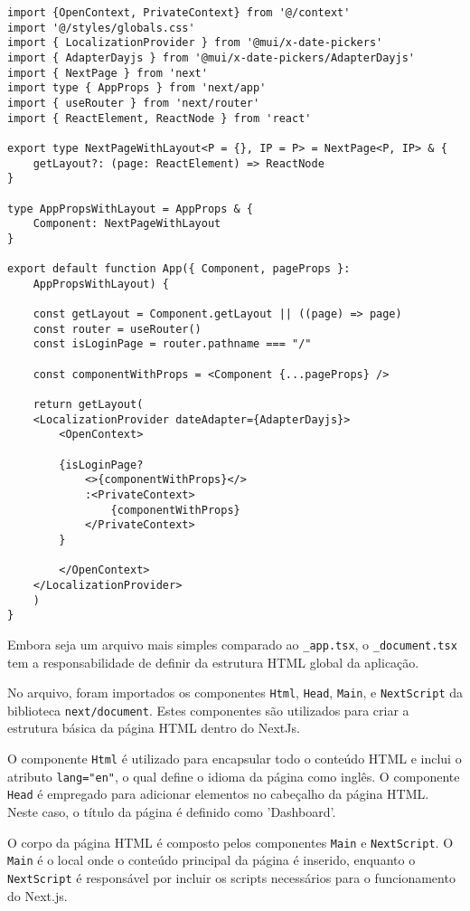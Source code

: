 \begin{verbatim}
import {OpenContext, PrivateContext} from '@/context'
import '@/styles/globals.css'
import { LocalizationProvider } from '@mui/x-date-pickers'
import { AdapterDayjs } from '@mui/x-date-pickers/AdapterDayjs'
import { NextPage } from 'next'
import type { AppProps } from 'next/app'
import { useRouter } from 'next/router'
import { ReactElement, ReactNode } from 'react'

export type NextPageWithLayout<P = {}, IP = P> = NextPage<P, IP> & {
    getLayout?: (page: ReactElement) => ReactNode
}

type AppPropsWithLayout = AppProps & {
    Component: NextPageWithLayout
}

export default function App({ Component, pageProps }: 
    AppPropsWithLayout) {

    const getLayout = Component.getLayout || ((page) => page)
    const router = useRouter()
    const isLoginPage = router.pathname === "/"

    const componentWithProps = <Component {...pageProps} /> 

    return getLayout(
    <LocalizationProvider dateAdapter={AdapterDayjs}>
        <OpenContext>

        {isLoginPage?
            <>{componentWithProps}</>
            :<PrivateContext>
                {componentWithProps}
            </PrivateContext>
        }

        </OpenContext>  
    </LocalizationProvider>
    )
}
\end{verbatim}

Embora seja um arquivo mais simples comparado ao \texttt{\_app.tsx}, o \texttt{\_document.tsx} tem a responsabilidade de definir da estrutura HTML global da aplicação.

No arquivo, foram importados os componentes \texttt{Html}, \texttt{Head}, \texttt{Main}, e \texttt{NextScript} da biblioteca \texttt{next/document}. Estes componentes são utilizados para criar a estrutura básica da página HTML dentro do NextJs.

O componente \texttt{Html} é utilizado para encapsular todo o conteúdo HTML e inclui o atributo \texttt{lang="en"}, o qual define o idioma da página como inglês. O componente \texttt{Head} é empregado para adicionar elementos no cabeçalho da página HTML. Neste caso, o título da página é definido como 'Dashboard'.

O corpo da página HTML é composto pelos componentes \texttt{Main} e \texttt{NextScript}. O \texttt{Main} é o local onde o conteúdo principal da página é inserido, enquanto o \texttt{NextScript} é responsável por incluir os scripts necessários para o funcionamento do Next.js.

